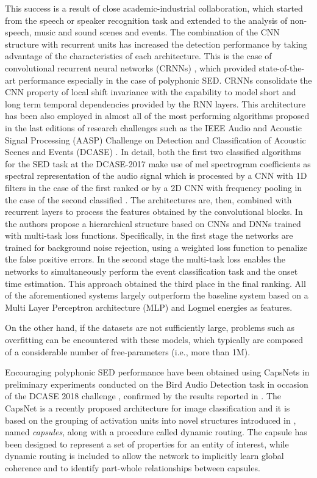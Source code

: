 This success is a result of close academic-industrial collaboration, which started from the speech or speaker recognition task and extended to the analysis of non-speech, music and sound scenes and events. The combination of the CNN structure with recurrent units has increased the detection performance by taking advantage of the characteristics of each architecture. This is the case of convolutional recurrent neural networks (CRNNs) \cite{cakir2017convolutional}, which provided state-of-the-art performance especially in the case of polyphonic SED. CRNNs consolidate the CNN property of local shift invariance with the capability to model short and long term temporal dependencies provided by the RNN layers. This architecture has been also employed in almost all of the most performing algorithms proposed in the last editions of research challenges such as the IEEE Audio and Acoustic Signal Processing (AASP) Challenge on  Detection and Classification of Acoustic Scenes and Events (DCASE) \cite{DCASE2017Workshop}. 
In detail, both the first two classified algorithms for the SED task at the DCASE-2017 make use of mel spectrogram coefficients as spectral representation of the audio signal which is processed by a CNN with 1D filters in the case of the first ranked \cite{limrare} or by a 2D CNN with frequency pooling in the case of the second classified \cite{cakirconvolutional}. The architectures are, then, combined with recurrent layers to process the features obtained by the convolutional blocks.
In \cite{phan2017dnn} the authors propose a hierarchical structure based on CNNs and DNNs trained with multi-task loss functions. Specifically, in the first stage the networks are trained for background noise rejection, using a weighted loss function to penalize the false positive errors. In the second stage the multi-task loss enables the networks to simultaneously perform the event classification task and the onset time estimation. This approach obtained the third place in the final ranking. 
All of the aforementioned systems largely outperform the baseline system based on a Multi Layer Perceptron architecture (MLP) and Logmel energies as features.

On the other hand, if the datasets are not sufficiently large, problems such as overfitting can be encountered with these models, which typically are composed of a considerable number of free-parameters (i.e., more than 1M). 

Encouraging polyphonic SED performance have been obtained using CapsNets in preliminary experiments conducted on the Bird Audio Detection task in occasion of the DCASE 2018 challenge \cite{vesperini2018capsule}, confirmed by the results reported in \cite{iqbal2018capsule}.
The CapsNet \cite{sabour2017dynamic} is a recently proposed architecture for image classification and it is based on the grouping of activation units into novel structures introduced in \cite{hinton2011transforming}, named \textit{capsules}, along with a procedure called dynamic routing. The capsule has been designed to represent a set of properties for an entity of interest, while dynamic routing is included to allow the network to implicitly learn global coherence and to identify part-whole relationships between capsules.

